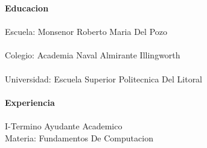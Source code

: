 \begin{tabbing}
{\large \bf Educacion}                                         \\ \\

\> Escuela:             \> Monsenor Roberto Maria Del Pozo                           \\ \\
\> Colegio:             \> Academia Naval Almirante  Illingworth                                     \\ \\
\> Universidad:      \> Escuela Superior Politecnica Del Litoral                                   \\ \\


{\large \bf Experiencia}                                                     \\ \\

 I-Termino      \> Ayudante Academico                  \\
\>                          \> {Materia: Fundamentos De Computacion}                      \\ \\

\end{tabbing}



